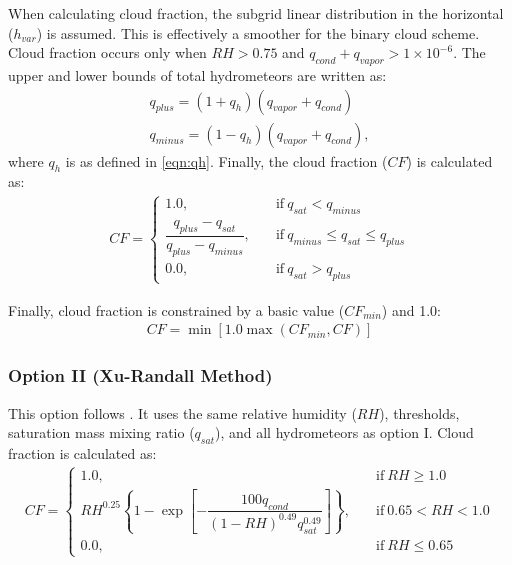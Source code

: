 \documentclass[letterpaper,titlepage,10pt]{article}
\numberwithin{equation}{section}
\begin{document}
When calculating cloud fraction, the subgrid linear distribution in the horizontal ($h_{var}$) is assumed. This is effectively a smoother for the binary cloud scheme. Cloud fraction occurs only when $RH > 0.75$ and $q_{cond} + q_{vapor} > 1 \times 10^{-6}$. The upper and lower bounds of total hydrometeors are written as:
\begin{gather}
	q_{plus} = \left(1 + q_h \right) \left(q_{vapor} + q_{cond} \right) \\
	q_{minus} = \left(1 - q_h \right) \left(q_{vapor} + q_{cond} \right),
\end{gather}
where $q_h$ is as defined in \eqref{eqn:qh}. Finally, the cloud fraction ($CF$) is calculated as:
\begin{align}
	CF =
	\begin{cases}
		1.0, & \quad \text{if}\ q_{sat} < q_{minus} \\
		\dfrac{q_{plus}-q_{sat}}{q_{plus}-q_{minus}}, & \quad \text{if}\ q_{minus} \leq q_{sat} \leq q_{plus}  \\
		0.0, & \quad \text{if}\ q_{sat} > q_{plus}
	\end{cases}
\end{align}

Finally, cloud fraction is constrained by a basic value ($CF_{min}$) and 1.0:
\begin{gather}
	CF = \min \left[1.0 \max \left(CF_{min}, CF \right) \right]
\end{gather}


\subsubsection*{Option II (Xu-Randall Method)}

This option follows \citet{xu1996asem}. It uses the same relative humidity ($RH$), thresholds, saturation mass mixing ratio ($q_{sat}$), and all hydrometeors as option I. Cloud fraction is calculated as:
\begin{align}
	CF = 
	\begin{cases}
		1.0, & \quad \text{if} \ RH \geq 1.0 \\
		RH^{0.25} \left\{1 - \exp \left[- \dfrac{100 q_{cond}}{\left(1 - RH \right)^{0.49} q_{sat}^{0.49}} \right] \right\}, & \quad \text{if} \ 0.65 < RH < 1.0 \\
		0.0, & \quad \text{if} \ RH \leq 0.65
	\end{cases}
\end{align}
\end{document}
